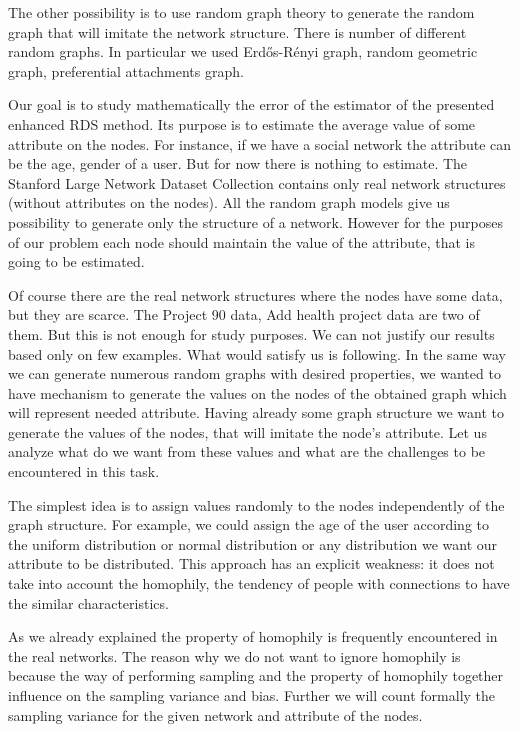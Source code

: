 \documentclass[12pt]{report}
\begin{document}
The other possibility is to use random graph theory to generate the random graph that will imitate the network structure. There is number of different random graphs. In particular we used Erd{\H{o}}s-R{\'e}nyi graph, random geometric graph, preferential attachments graph.

Our goal is to study mathematically the error of the estimator of the presented enhanced RDS method. Its purpose is to estimate the average value of some attribute on the nodes. For instance, if we have a social network the attribute can be the age, gender of a user. But for now there is nothing to estimate. The Stanford Large Network Dataset Collection contains only real network structures (without attributes on the nodes). All the random graph models give us possibility to generate only the structure of a network.
However for the purposes of our problem each node should maintain the value of the attribute, that is going to be estimated.  

Of course there are the real network structures where the nodes have some data, but they are scarce. The Project 90 data\cite{Project90}, Add health project data\cite{Addhealth} are two of them. 
But this is not enough for study purposes. We can not justify our results based only on few examples. What would satisfy us is following. In the same way we can generate numerous random graphs with desired properties, we wanted to have mechanism to generate the values on the nodes of the obtained graph which will represent needed attribute. Having already some graph structure we want to generate the values of the nodes, that will imitate the node's attribute. Let us analyze what do we want from these values and what are the challenges to be encountered in this task.


The simplest idea is to assign values randomly to the nodes independently of the graph structure. For example, we could assign the age of the user according to the uniform distribution or normal distribution or any distribution we want our attribute to be distributed. This approach has an explicit weakness: it does not take into account the homophily, the tendency of people with connections to have the similar characteristics.

As we already explained the property of homophily is frequently encountered in the real networks. The reason why we do not want to ignore homophily is because the way of performing sampling and the property of homophily together influence on the sampling variance and bias. Further we will count formally the sampling variance for the given network and attribute of the nodes.
\end{document}
